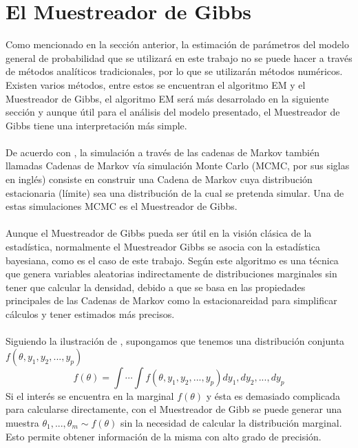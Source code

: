 \section{El Muestreador de Gibbs}
Como mencionado en la secci\'on anterior, la estimaci\'on de par\'ametros del modelo general de probabilidad que se utilizar\'a en este trabajo no se puede hacer a trav\'es de m\'etodos anal\'iticos tradicionales, por lo que se utilizar\'an m\'etodos num\'ericos. Existen varios m\'etodos, entre estos se encuentran el algoritmo EM y el Muestreador de Gibbs, el algoritmo EM ser\'a m\'as desarrolado en la siguiente secci\'on y aunque \'util para el an\'alisis del modelo presentado, el Muestreador de Gibbs tiene una interpretaci\'on m\'as simple.\\
\\
De acuerdo con \cite{gelman2014bayesian}, la simulaci\'on a trav\'es de las cadenas de Markov tambi\'en llamadas Cadenas de Markov v\'ia simulaci\'on Monte Carlo (MCMC, por sus siglas en ingl\'es) consiste en construir una Cadena de Markov cuya distribuci\'on estacionaria (l\'imite) sea una distribuci\'on de la cual se pretenda simular. Una de estas simulaciones MCMC es el Muestreador de Gibbs.\\
\\
Aunque el Muestreador de Gibbs pueda ser \'util en la visi\'on cl\'asica de la estad\'istica, normalmente el Muestreador Gibbs se asocia con la estad\'istica bayesiana, como es el caso de este trabajo. Seg\'un \cite{casella1992explaining} este algoritmo es una t\'ecnica que genera variables aleatorias indirectamente de distribuciones marginales sin tener que calcular la densidad, debido a que se basa en las propiedades principales de las Cadenas de Markov como la estacionareidad para simplificar c\'alculos y tener estimados m\'as precisos.\\
\\
Siguiendo la ilustraci\'on de \cite{casella1992explaining}, supongamos que tenemos una distribuci\'on conjunta $f(\theta,y_1,y_2,...,y_p)$\\
\[f(\theta)=\int \cdots \int f(\theta,y_1,y_2,...,y_p) dy_1,dy_2,...,dy_p\]
Si el inter\'es se encuentra en la marginal $f(\theta)$ y \'esta es demasiado complicada para calcularse directamente, con el Muestreador de Gibb se puede generar una muestra $\theta_1,...,\theta_m \sim f(\theta)$ sin la necesidad de calcular la distribuci\'on marginal. Esto permite obtener informaci\'on de la misma con alto grado de precisi\'on.\\
\\

